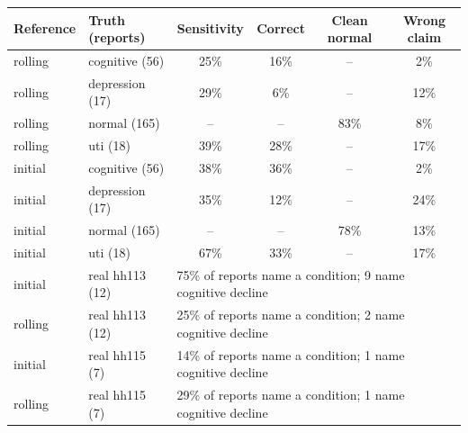 \begin{tabular}{llcccc}
\toprule
Reference & Truth (reports) & Sensitivity & Correct & Clean normal & Wrong claim \\
\midrule
rolling & cognitive (56) & 25\% & 16\% & -- & 2\% \\
rolling & depression (17) & 29\% & 6\% & -- & 12\% \\
rolling & normal (165) & -- & -- & 83\% & 8\% \\
rolling & uti (18) & 39\% & 28\% & -- & 17\% \\
\midrule
initial & cognitive (56) & 38\% & 36\% & -- & 2\% \\
initial & depression (17) & 35\% & 12\% & -- & 24\% \\
initial & normal (165) & -- & -- & 78\% & 13\% \\
initial & uti (18) & 67\% & 33\% & -- & 17\% \\
\midrule
initial & real hh113 (12) & \multicolumn{4}{l}{75\% of reports name a condition; 9 name cognitive decline} \\
rolling & real hh113 (12) & \multicolumn{4}{l}{25\% of reports name a condition; 2 name cognitive decline} \\
initial & real hh115 (7) & \multicolumn{4}{l}{14\% of reports name a condition; 1 name cognitive decline} \\
rolling & real hh115 (7) & \multicolumn{4}{l}{29\% of reports name a condition; 1 name cognitive decline} \\
\bottomrule
\end{tabular}
